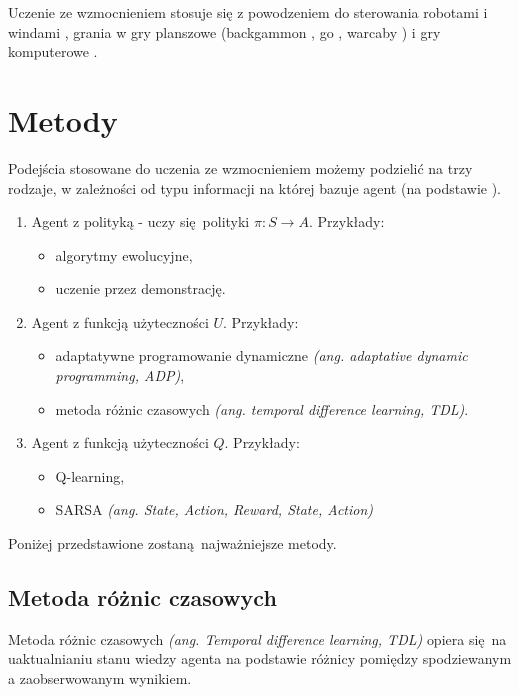 \documentclass[polish,master,a4paper,oneside]{ppfcmthesis}
\begin{document}
Uczenie ze wzmocnieniem stosuje się z powodzeniem do sterowania robotami \cite{Mataric94rewardfunctions} i windami \cite{Crites96improvingelevator}, grania w gry planszowe (backgammon \cite{Tesauro1992451}, \break go \cite{Silver_2016}, warcaby \cite{Samuel:1959:SML:1661923.1661924}) i gry komputerowe \cite{mnih2015human}.



 \section{Metody}\label{methods}

Podejścia stosowane do uczenia ze wzmocnieniem możemy podzielić na trzy rodzaje, w zależności od typu informacji na której bazuje agent (na podstawie \cite{Russell:2009:AIM:1671238}).

\begin{enumerate}
\item Agent z polityką - uczy się polityki  $\pi: S \rightarrow A$. Przykłady:
\begin{itemize}
\item algorytmy ewolucyjne,
\item uczenie przez demonstrację.
\end{itemize}
\item Agent z funkcją użyteczności $U$. Przykłady:
\begin{itemize}
\item adaptatywne programowanie dynamiczne \textit{(ang. adaptative dynamic programming, ADP)},
\item metoda różnic czasowych \textit{(ang. temporal difference learning, TDL)}.
\end{itemize}
\item Agent z funkcją użyteczności $Q$. Przykłady:
\begin{itemize}
\item Q-learning,
\item SARSA \textit{(ang. State, Action, Reward, State, Action)}
\end{itemize}
\end{enumerate}

Poniżej przedstawione zostaną najważniejsze metody.

\subsection{Metoda różnic czasowych}\label{tdl}

Metoda różnic czasowych \textit{(ang. Temporal difference learning, TDL)} \cite{Sutton:1988:LPM:637912.637937} opiera się na uaktualnianiu stanu wiedzy agenta na podstawie różnicy pomiędzy spodziewanym a zaobserwowanym wynikiem.
\end{document}
